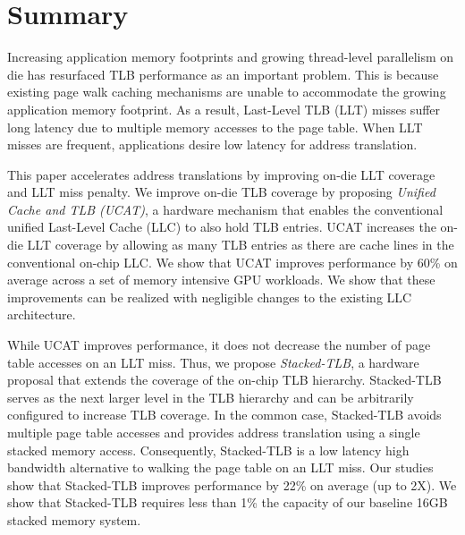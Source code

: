 \section{Summary}

\noindent Increasing application memory footprints and growing
thread-level parallelism on die has resurfaced TLB performance as an
important problem. This is because existing page walk caching
mechanisms are unable to accommodate the growing application memory
footprint. As a result, Last-Level TLB (LLT) misses suffer long
latency due to multiple memory accesses to the page table. When LLT
misses are frequent, applications desire low latency for address
translation.

This paper accelerates address translations by improving on-die LLT
coverage and LLT miss penalty. We improve on-die TLB coverage by
proposing {\em Unified Cache and TLB (UCAT)}, a hardware mechanism
that enables the conventional unified Last-Level Cache (LLC) to also
hold TLB entries. UCAT increases the on-die LLT coverage by allowing
as many TLB entries as there are cache lines in the conventional
on-chip LLC. We show that UCAT improves performance by 60\% on average
across a set of memory intensive GPU workloads. We show that these
improvements can be realized with negligible changes to the existing
LLC architecture.


While UCAT improves performance, it does not decrease the number of
page table accesses on an LLT miss. Thus, we propose {\em
Stacked-TLB}, a hardware proposal that extends the coverage of the
on-chip TLB hierarchy. Stacked-TLB serves as the next larger level in
the TLB hierarchy and can be arbitrarily configured to increase TLB
coverage. In the common case, Stacked-TLB avoids multiple page table
accesses and provides address translation using a single stacked
memory access. Consequently, Stacked-TLB is a low latency high
bandwidth alternative to walking the page table on an LLT miss. Our
studies show that Stacked-TLB improves performance by 22\% on average
(up to 2X). We show that Stacked-TLB requires less than 1\% the
capacity of our baseline 16GB stacked memory system.

% 
